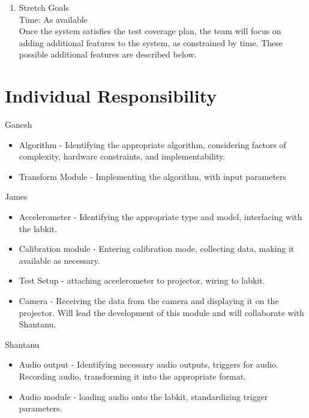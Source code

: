 \documentclass{article}
\begin{document}
\begin{enumerate}
	\item Stretch Goals \hfill \\
		Time: As available \hfill \\
		Once the system satisfies the test coverage plan, the team will focus on adding additional features to the system, as constrained by time. These possible additional features are described below.

\end{enumerate}

\section{Individual Responsibility}
\begin{description}
	\item{Ganesh}
	\begin{itemize}
		\item Algorithm - Identifying the appropriate algorithm, considering factors of complexity, hardware constraints, and implementability.
		\item Transform Module - Implementing the algorithm, with input parameters
	\end{itemize}
	\item{James}
	\begin{itemize}
		\item Accelerometer - Identifying the appropriate type and model, interfacing with the labkit.
		\item Calibration module - Entering calibration mode, collecting data, making it available as necessary.
		\item Test Setup - attaching accelerometer to projector, wiring to labkit.
		\item Camera - Receiving the data from the camera and displaying it on the projector. Will lead the development of this module and will collaborate with Shantanu. 
	\end{itemize}
	\item{Shantanu}
	\begin{itemize}
		\item Audio output - Identifying necessary audio outputs, triggers for audio. Recording audio, transforming it into the appropriate format.
		\item Audio module - loading audio onto the labkit, standardizing trigger parameters.
	\end{itemize}
\end{description}
\end{document}
